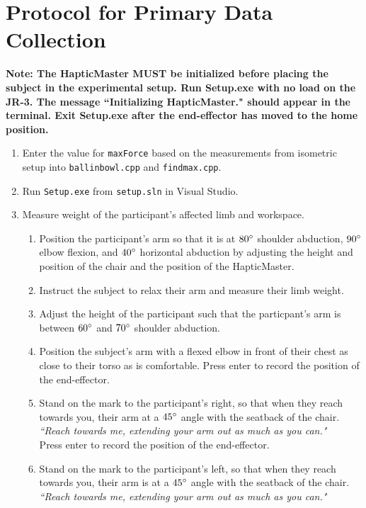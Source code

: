 \documentclass[11pt]{article}
\begin{document}
\section{Protocol for Primary Data Collection}
\textbf{Note: The HapticMaster MUST be initialized before placing the subject in the experimental setup. Run Setup.exe with no load on the JR-3. The message ``Initializing HapticMaster." should appear in the terminal. Exit Setup.exe after the end-effector has moved to the home position.}
\begin{enumerate}
\item Enter the value for \texttt{maxForce} based on the measurements from isometric setup into \texttt{ballinbowl.cpp} and \texttt{findmax.cpp}.
\item Run \texttt{Setup.exe} from \texttt{setup.sln} in Visual Studio. 
\item Measure weight of the participant's affected limb and workspace.
	\begin{enumerate}
	\item Position the participant's arm so that it is at $80\degree$ shoulder abduction, $90\degree$ elbow flexion, and $40\degree$ horizontal abduction by adjusting the height and position of the chair and the position of the HapticMaster.
	\item Instruct the subject to relax their arm and measure their limb weight.
	\item Adjust the height of the participant such that the particpant's arm is between $60\degree$ and $70\degree$ shoulder abduction. 
	\item Position the subject's arm with a flexed elbow in front of their chest as close to their torso as is comfortable. Press enter to record the position of the end-effector.
	\item Stand on the mark to the participant's right, so that when they reach towards you, their arm at a $45\degree$ angle with the seatback of the chair.\\
\textit{``Reach towards me, extending your arm out as much as you can."}\\	
	 Press enter to record the position of the end-effector.
	\item Stand on the mark to the participant's left, so that when they reach towards you, their arm is at a $45\degree$ angle with the seatback of the chair.\\
\textit{``Reach towards me, extending your arm out as much as you can."}\\	

\end{enumerate}
\end{enumerate}
\end{document}
